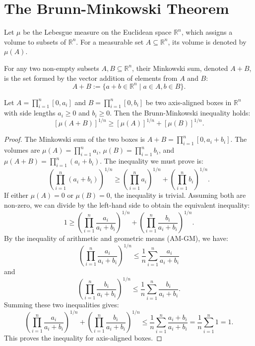 \chapter{The Brunn-Minkowski Theorem}

\begin{definition}
Let $\mu$ be the Lebesgue measure on the Euclidean space $\mathbb{R}^n$, which assigns a volume to subsets of $\mathbb{R}^n$. For a measurable set $A \subseteq \mathbb{R}^n$, its volume is denoted by $\mu(A)$.
\end{definition}

\begin{definition}
For any two non-empty subsets $A, B \subseteq \mathbb{R}^n$, their Minkowski sum, denoted $A+B$, is the set formed by the vector addition of elements from $A$ and $B$:
$$A+B := \{a+b \in \mathbb{R}^n \mid a \in A, b \in B\}.$$
\end{definition}

\begin{lemma}
Let $A = \prod_{i=1}^{n}[0, a_i]$ and $B = \prod_{i=1}^{n}[0, b_i]$ be two axis-aligned boxes in $\mathbb{R}^n$ with side lengths $a_i \ge 0$ and $b_i \ge 0$. Then the Brunn-Minkowski inequality holds:
$$[\mu(A+B)]^{1/n} \ge [\mu(A)]^{1/n} + [\mu(B)]^{1/n}.$$
\end{lemma}

\begin{proof}
The Minkowski sum of the two boxes is $A+B = \prod_{i=1}^{n}[0, a_i+b_i]$. The volumes are $\mu(A) = \prod_{i=1}^{n} a_i$, $\mu(B) = \prod_{i=1}^{n} b_i$, and $\mu(A+B) = \prod_{i=1}^{n} (a_i+b_i)$. The inequality we must prove is:
$$\left(\prod_{i=1}^{n} (a_i+b_i)\right)^{1/n} \ge \left(\prod_{i=1}^{n} a_i\right)^{1/n} + \left(\prod_{i=1}^{n} b_i\right)^{1/n}.$$
If either $\mu(A)=0$ or $\mu(B)=0$, the inequality is trivial. Assuming both are non-zero, we can divide by the left-hand side to obtain the equivalent inequality:
$$1 \ge \left(\prod_{i=1}^{n} \frac{a_i}{a_i+b_i}\right)^{1/n} + \left(\prod_{i=1}^{n} \frac{b_i}{a_i+b_i}\right)^{1/n}.$$
By the inequality of arithmetic and geometric means (AM-GM), we have:
$$\left(\prod_{i=1}^{n} \frac{a_i}{a_i+b_i}\right)^{1/n} \le \frac{1}{n} \sum_{i=1}^{n} \frac{a_i}{a_i+b_i}$$
and
$$\left(\prod_{i=1}^{n} \frac{b_i}{a_i+b_i}\right)^{1/n} \le \frac{1}{n} \sum_{i=1}^{n} \frac{b_i}{a_i+b_i}.$$
Summing these two inequalities gives:
$$\left(\prod_{i=1}^{n} \frac{a_i}{a_i+b_i}\right)^{1/n} + \left(\prod_{i=1}^{n} \frac{b_i}{a_i+b_i}\right)^{1/n} \le \frac{1}{n} \sum_{i=1}^{n} \frac{a_i+b_i}{a_i+b_i} = \frac{1}{n} \sum_{i=1}^{n} 1 = 1.$$
This proves the inequality for axis-aligned boxes.
\end{proof}

